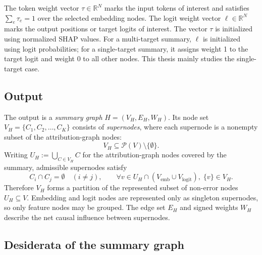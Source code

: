 \documentclass[../main.tex]{subfiles}
\begin{document}
The token weight vector $\tau \in \mathbb{R}^N$ marks
the input tokens of interest and satisfies $\sum_e \tau_e = 1$ over the selected
embedding nodes. The logit weight vector $\ell \in \mathbb{R}^N$ marks the output
positions or target logits of interest. The vector $\tau$ is initialized using
normalized SHAP values. For a multi-target summary, $\ell$ is initialized using
logit probabilities; for a single-target summary, it assigns weight 1 to the
target logit and weight 0 to all other nodes. This thesis mainly studies the
single-target case.

\subsection{Output}

The output is a \emph{summary graph} $H = (V_H, E_H, W_H)$. Its node set
$V_H = \{C_1, C_2, \dots, C_K\}$ consists of \emph{supernodes}, where each
supernode is a nonempty subset of the attribution-graph nodes:
\begin{equation}
V_H \subseteq \mathcal{P}\!\left(V\right)
\setminus \{\emptyset\}.
\label{eq:summary-node-set}
\end{equation}
Writing $U_H := \bigcup_{C \in V_H} C$ for the attribution-graph nodes covered
by the summary, admissible supernodes satisfy
\begin{equation}
C_i \cap C_j = \emptyset \quad (i \ne j),
\qquad
\forall v \in U_H \cap (V_{\text{emb}} \cup V_{\text{logit}}),\; \{v\} \in V_H.
\label{eq:supernode-conditions}
\end{equation}
Therefore $V_H$ forms a partition of the represented subset of non-error nodes
$U_H \subseteq V$. Embedding and logit nodes are
represented only as singleton supernodes, so only feature nodes may be grouped.
The edge set $E_H$ and signed weights $W_H$ describe the net causal influence
between supernodes.

\subsection{Desiderata of the summary graph}
\end{document}
